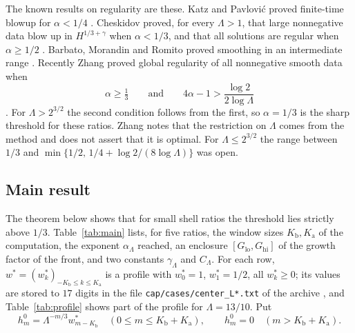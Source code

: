 \documentclass[12pt,reqno]{amsart}
\numberwithin{equation}{section}
\theoremstyle{plain}
\theoremstyle{definition}
\theoremstyle{remark}
\newcommand{\Kb}{K_{\mathrm b}}
\newcommand{\Ka}{K_{\mathrm a}}
\newcommand{\Glo}{G_{\mathrm{lo}}}
\newcommand{\Ghi}{G_{\mathrm{hi}}}
\begin{document}
The known results on regularity are these. Katz and Pavlovi\'c proved
finite-time blowup for $\alpha<1/4$ \cite{KP05}. Cheskidov proved, for every
$\Lambda>1$, that large nonnegative data blow up in $H^{1/3+\gamma}$ when
$\alpha<1/3$, and that all solutions are regular when $\alpha\ge1/2$
\cite[Theorems~4.4 and~5.3]{Che08}. Barbato, Morandin and Romito proved
smoothing in an intermediate range \cite{BMR11}. Recently Zhang proved
global regularity of all nonnegative smooth data when
\begin{equation}\label{eq:Zhang}
  \alpha\ge\tfrac13\qquad\text{and}\qquad 4\alpha-1>\frac{\log2}{2\log\Lambda}
\end{equation}
\cite[Theorem~1.2]{Zha26}. For $\Lambda>2^{3/2}$ the second condition
follows from the first, so $\alpha=1/3$ is the sharp threshold for these
ratios. Zhang notes that the restriction on $\Lambda$ comes from the method
and does not assert that it is optimal. For $\Lambda\le2^{3/2}$ the range
between $1/3$ and $\min\{1/2,\,1/4+\log2/(8\log\Lambda)\}$ was open.

\subsection{Main result}
The theorem below shows that for small shell ratios the threshold lies
strictly above $1/3$. Table~\ref{tab:main} lists, for five ratios, the
window sizes $\Kb,\Ka$ of the computation, the exponent $\alpha_\Lambda$
reached, an enclosure $[\Glo,\Ghi]$ of the growth factor of the front, and
two constants $\gamma_\Lambda$ and $C_\Lambda$. For each row, $w^*=(w^*_k)_{-\Kb\le
k\le\Ka}$ is a profile with $w^*_0=1$, $w^*_1=1/2$, all $w^*_k\ge0$; its
values are stored to $17$ digits in the file
\texttt{cap/cases/center\_L*.txt} of the archive \cite{Data}, and
Table~\ref{tab:profile} shows part of the profile for $\Lambda=13/10$. Put
\begin{equation}\label{eq:datum}
  h^0_m=\Lambda^{-m/3}w^*_{m-\Kb}\quad(0\le m\le\Kb+\Ka),\qquad h^0_m=0\quad(m>\Kb+\Ka).
\end{equation}
\end{document}
